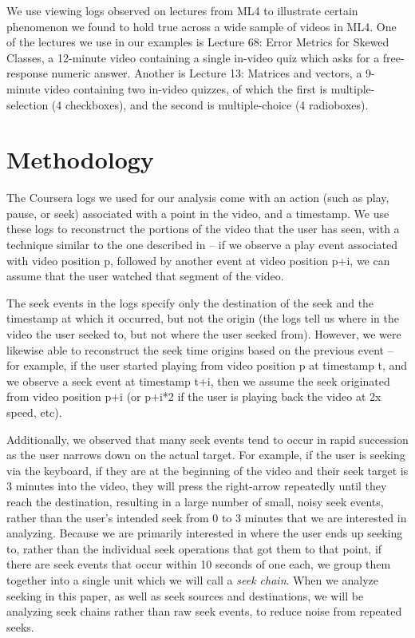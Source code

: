\documentclass[letterpaper]{article}
\begin{document}
We use viewing logs observed on lectures from ML4 to illustrate certain phenomenon we found to hold true across a wide sample of videos in ML4. One of the lectures we use in our examples is Lecture 68: Error Metrics for Skewed Classes, a 12-minute video containing a single in-video quiz which asks for a free-response numeric answer. Another is Lecture 13: Matrices and vectors, a 9-minute video containing two in-video quizzes, of which the first is multiple-selection (4 checkboxes), and the second is multiple-choice (4 radioboxes).

\section{Methodology}

The Coursera logs we used for our analysis come with an action (such as play, pause, or seek) associated with a point in the video, and a timestamp. We use these logs to reconstruct the portions of the video that the user has seen, with a technique similar to the one described in \cite{juho} -- if we observe a play event associated with video position p, followed by another event at video position p+i, we can assume that the user watched that segment of the video.

The seek events in the logs specify only the destination of the seek and the timestamp at which it occurred, but not the origin (the logs tell us where in the video the user seeked to, but not where the user seeked from). However, we were likewise able to reconstruct the seek time origins based on the previous event -- for example, if the user started playing from video position p at timestamp t, and we observe a seek event at timestamp t+i, then we assume the seek originated from video position p+i (or p+i*2 if the user is playing back the video at 2x speed, etc).

Additionally, we observed that many seek events tend to occur in rapid succession as the user narrows down on the actual target. For example, if the user is seeking via the keyboard, if they are at the beginning of the video and their seek target is 3 minutes into the video, they will press the right-arrow repeatedly until they reach the destination, resulting in a large number of small, noisy seek events, rather than the user's intended seek from 0 to 3 minutes that we are interested in analyzing. Because we are primarily interested in where the user ends up seeking to, rather than the individual seek operations that got them to that point, if there are seek events that occur within 10 seconds of one each, we group them together into a single unit which we will call a \textit{seek chain}. When we analyze seeking in this paper, as well as seek sources and destinations, we will be analyzing seek chains rather than raw seek events, to reduce noise from repeated seeks.
\end{document}
